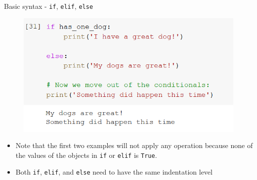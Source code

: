 \documentclass[aspectratio=169]{beamer}
\begin{document}
\begin{frame}{Basic syntax - \texttt{if}, \texttt{elif}, \texttt{else}}
\begin{multicols}{3}
\begin{figure}
			\centering
			\includegraphics[width=\linewidth]{img/if_else.png}
		\end{figure}

	\end{multicols}

	\begin{itemize}
		\item Note that the first two examples will not apply any operation because none of the values of the objects in \texttt{if} or \texttt{elif} is \texttt{True}.
		\item Both \texttt{if}, \texttt{elif}, and \texttt{else} need to have the same indentation level
	\end{itemize}

\end{frame}
\end{document}
